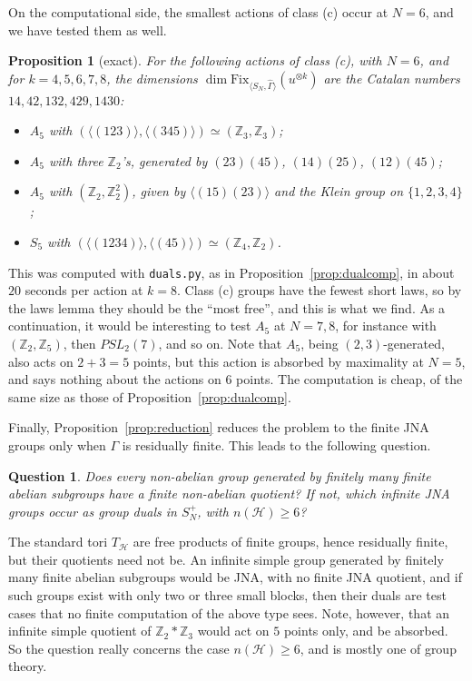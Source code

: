 \documentclass[11pt]{amsart}
\newtheorem{proposition}[theorem]{Proposition}
\newtheorem{question}[theorem]{Question}
\theoremstyle{definition}
\theoremstyle{remark}
\theoremstyle{plain}
\numberwithin{equation}{section}
\numberwithin{table}{section}
\newcommand{\Z}{\mathbb Z}
\newcommand{\Fix}{\mathrm{Fix}}
\begin{document}
On the computational side, the smallest actions of class (c) occur at $N=6$, and we have tested them as well.

\begin{proposition}[exact]\label{prop:classc}
For the following actions of class (c), with $N=6$, and for $k=4,5,6,7,8$, the dimensions $\dim\Fix_{\langle S_N,\widehat\Gamma\rangle}(u^{\otimes k})$ are the Catalan numbers $14,42,132,429,1430$:
\begin{itemize}
\item $A_5$ with $(\langle(123)\rangle,\langle(345)\rangle)\simeq(\Z_3,\Z_3)$;
\item $A_5$ with three $\Z_2$'s, generated by $(23)(45)$, $(14)(25)$, $(12)(45)$;
\item $A_5$ with $(\Z_2,\Z_2^2)$, given by $\langle(15)(23)\rangle$ and the Klein group on $\{1,2,3,4\}$;
\item $S_5$ with $(\langle(1234)\rangle,\langle(45)\rangle)\simeq(\Z_4,\Z_2)$.
\end{itemize}
\end{proposition}

This was computed with \texttt{duals.py}, as in Proposition~\ref{prop:dualcomp}, in about $20$ seconds per action at $k=8$. Class (c) groups have the fewest short laws, so by the laws lemma they should be the ``most free'', and this is what we find. As a continuation, it would be interesting to test $A_5$ at $N=7,8$, for instance with $(\Z_2,\Z_5)$, then $PSL_2(7)$, and so on. Note that $A_5$, being $(2,3)$-generated, also acts on $2+3=5$ points, but this action is absorbed by maximality at $N=5$, and says nothing about the actions on $6$ points. The computation is cheap, of the same size as those of Proposition~\ref{prop:dualcomp}.

Finally, Proposition~\ref{prop:reduction} reduces the problem to the finite JNA groups only when $\Gamma$ is residually finite. This leads to the following question.

\begin{question}\label{qu:infjna}
Does every non-abelian group generated by finitely many finite abelian subgroups have a finite non-abelian quotient? If not, which infinite JNA groups occur as group duals in $S_N^+$, with $n(\mathcal H)\ge6$?
\end{question}

The standard tori $T_{\mathcal H}$ are free products of finite groups, hence residually finite, but their quotients need not be. An infinite simple group generated by finitely many finite abelian subgroups would be JNA, with no finite JNA quotient, and if such groups exist with only two or three small blocks, then their duals are test cases that no finite computation of the above type sees. Note, however, that an infinite simple quotient of $\Z_2*\Z_3$ would act on $5$ points only, and be absorbed. So the question really concerns the case $n(\mathcal H)\ge6$, and is mostly one of group theory.
\end{document}
